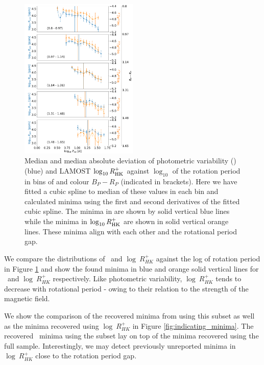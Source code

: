 \begin{figure}
\centering
    \includegraphics[width=0.5\textwidth]{Figures/rot_gap_figures/rot_vs_rper_rhk_minima.png}
    \caption{
    Median and median absolute deviation of photometric variability (\rper{}) (blue) and LAMOST $\log_{10}R^{+}_{\rm{HK}}$ against $\log_10$ of the rotation period in bins of and colour \gaia{} $B_P-R_P$ (indicated in brackets). Here we have fitted a cubic spline to median of these values in each bin and calculated minima using the first and second derivatives of the fitted cubic spline. The minima in \rper{} are shown by solid vertical blue lines while the minima in $\log_{10}R^{+}_{\rm{HK}}$ are shown in solid vertical orange lines. These minima align with each other and the rotational period gap.}
    \label{fig:rot_rper_rhk}
\end{figure}

We compare the distributions of \rper{} \ and $\log \ R^{+}_{HK}$ against the log of rotation period in Figure \ref{fig:rot_rper_rhk} and show the found minima in blue and orange solid vertical lines for \rper{} \ and $\log \ R^{+}_{HK}$ respectively.
Like photometric variability, $\log \ R^{+}_{HK}$ tends to decrease with rotational period - owing to their relation to the strength of the magnetic field.

We show the comparison of the recovered minima from \rper{} using this subset as well as the minima recovered using $\log \ R^{+}_{HK}$ in Figure \ref{fig:indicating_minima}.
The recovered \rper{} \ minima using the subset lay on top of the \rper{} minima recovered using the full sample.
Interestingly, we may detect previously unreported minima in $\log \ R^{+}_{HK}$ close to the rotation period gap.

